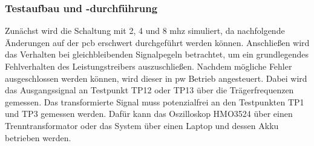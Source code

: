 \subsubsection*{Testaufbau und -durchführung}
Zunächst wird die Schaltung mit 2, 4 und 8 \ac{mhz} simuliert, da nachfolgende Änderungen auf der \ac{pcb} erschwert durchgeführt werden können. Anschließen wird das Verhalten bei gleichbleibenden Signalpegeln betrachtet, um ein grundlegendes Fehlverhalten des Leistungstreibers auszuschließen. 
Nachdem mögliche Fehler ausgeschlossen werden können, wird dieser in \ac{pw} Betrieb angesteuert. Dabei wird das Ausgangssignal an Testpunkt TP12 oder TP13 über die Trägerfrequenzen gemessen. Das transformierte Signal muss potenzialfrei an den Testpunkten TP1 und TP3 gemessen werden. Dafür kann das Oszilloskop HMO3524 über einen Trenntransformator oder das System über einen Laptop und dessen Akku betrieben werden.
